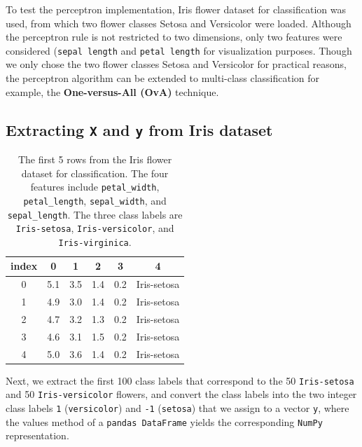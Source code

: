 \documentclass[11pt]{article}
\begin{document}
    To test the perceptron implementation, Iris flower dataset for classification was used, from which two flower classes Setosa and Versicolor were loaded.
    Although the perceptron rule is not restricted to two dimensions, only two features were considered (\texttt{sepal length} and \texttt{petal length} for visualization purposes.
    Though we only chose the two flower classes Setosa and Versicolor for practical reasons, the perceptron algorithm can be extended to multi-class classification \textemdash for example, the \textbf{One-versus-All (OvA)} technique.

    \subsection{Extracting \texttt{X} and \texttt{y} from Iris dataset} \label{subsec:perc_iris_extract}

    \begin{table}[h!]
        \centering
        \begin{tabular}{||c | c c c c | c||}
            \hline
            index & 0 & 1 & 2 & 3 & 4 \\
            \hline
            \hline
            0 & 5.1 & 3.5 & 1.4 & 0.2 & Iris-setosa \\
            \hline
            1 & 4.9 & 3.0 & 1.4 & 0.2 & Iris-setosa \\
            \hline
            2 & 4.7 & 3.2 & 1.3 & 0.2 & Iris-setosa \\
            \hline
            3 & 4.6 & 3.1 & 1.5 & 0.2 & Iris-setosa \\
            \hline
            4 & 5.0 & 3.6 & 1.4 & 0.2 & Iris-setosa \\
            \hline
        \end{tabular}
        \caption{The first 5 rows from the Iris flower dataset for classification.
        The four features include \texttt{petal\_width}, \texttt{petal\_length}, \texttt{sepal\_width}, and \texttt{sepal\_length}.
        The three class labels are \texttt{Iris-setosa}, \texttt{Iris-versicolor}, and \texttt{Iris-virginica}.}
        \label{tab:iris}

    \end{table}

    Next, we extract the first 100 class labels that correspond to the 50 \texttt{Iris-setosa} and 50 \texttt{Iris-versicolor} flowers, and convert the class labels into the two integer class labels \texttt{1} (\texttt{versicolor}) and \texttt{-1} (\texttt{setosa}) that we assign to a vector \texttt{y}, where the values method of a \texttt{pandas DataFrame} yields the corresponding \texttt{NumPy} representation.
\end{document}
